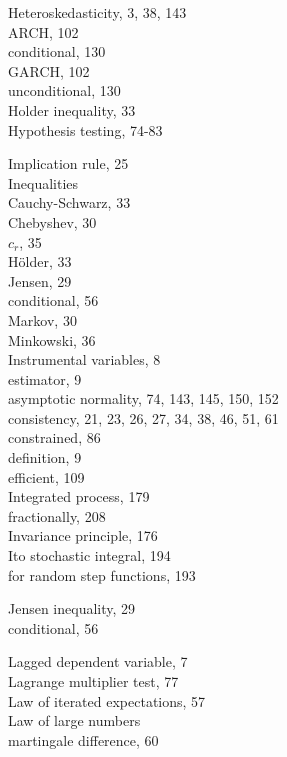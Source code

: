 \documentclass[10pt]{article}
\begin{document}
Heteroskedasticity, 3, 38, 143\\
ARCH, 102\\
conditional, 130\\
GARCH, 102\\
unconditional, 130\\
Holder inequality, 33\\
Hypothesis testing, 74-83

Implication rule, 25\\
Inequalities\\
Cauchy-Schwarz, 33\\
Chebyshev, 30\\
$c_{r}$, 35\\
Hölder, 33\\
Jensen, 29\\
conditional, 56\\
Markov, 30\\
Minkowski, 36\\
Instrumental variables, 8\\
estimator, 9\\
asymptotic normality, 74, 143, 145, 150, 152\\
consistency, 21, 23, 26, 27, 34, 38, 46, 51, 61\\
constrained, 86\\
definition, 9\\
efficient, 109\\
Integrated process, 179\\
fractionally, 208\\
Invariance principle, 176\\
Ito stochastic integral, 194\\
for random step functions, 193

Jensen inequality, 29\\
conditional, 56

Lagged dependent variable, 7\\
Lagrange multiplier test, 77\\
Law of iterated expectations, 57\\
Law of large numbers\\
martingale difference, 60
\end{document}
